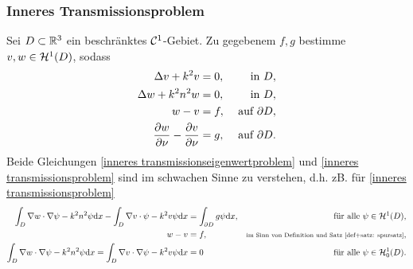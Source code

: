 \subsubsection*{Inneres Transmissionsproblem}
Sei \(D\subset\mathbb{R}^3\) ein beschränktes \(\mathcal{C}^1\)-Gebiet. Zu gegebenem \(f,g\) bestimme \(v,w\in\mathcal{H}^1(D)\), sodass
\begin{equation}
	\label{inneres transmissionsproblem}
	\begin{aligned}
		\Delta v+k^2v&=0,&\text{ in }D,\\
		\Delta w+k^2n^2w&=0,&\text{ in }D,\\
		w-v&=f,&\text{ auf }\partial D,\\
		\frac{\partial w}{\partial\nu}-\frac{\partial v}{\partial\nu}&=g,&\text{ auf }\partial D.
	\end{aligned}
\end{equation}
Beide Gleichungen \eqref{inneres transmissionseigenwertproblem} und \eqref{inneres transmissionsproblem} sind im schwachen Sinne zu verstehen, d.h. zB. für \eqref{inneres transmissionsproblem}
\begin{equation}
	\label{schwache formulierung des inneren transmissionsproblems}
	\begin{aligned}
		\int_D\nabla w\cdot\nabla \psi-k^2n^2\psi\mathrm{d}x - \int_D\nabla v\cdot\psi-k^2v\psi\mathrm{d}x
		&=\int_{\partial D}g\psi\mathrm{d}x,&\text{ für alle }\psi\in\mathcal{H}^1(D),\\
		w-v&=f,&\text{\scriptsize im Sinn von Definition und Satz \ref{def+satz: spursatz}},\\
		\int_D\nabla w\cdot\nabla\psi-k^2n^2\psi\mathrm{d}x=\int_D\nabla v\cdot\nabla\psi-k^2v\psi\mathrm{d}x&=0&\text{ für alle }\psi\in\mathcal{H}_0^1(D).
	\end{aligned}
\end{equation}
